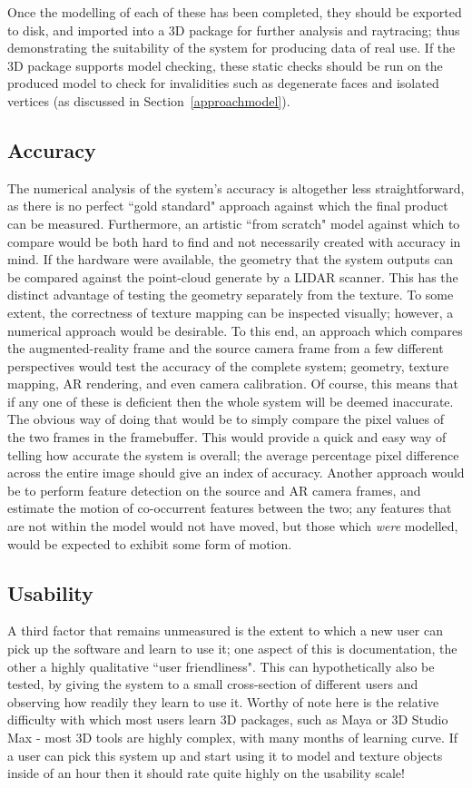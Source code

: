 \documentclass[a4paper,10pt]{article}
\begin{document}
Once the modelling of each of these has been completed, they should be exported to disk, and imported into a 3D package for further analysis and raytracing; thus demonstrating the suitability of the system for producing data of real use. If the 3D package supports model checking, these static checks should be run on the produced model to check for invalidities such as degenerate faces and isolated vertices (as discussed in Section~\ref{approachmodel}).

\subsection{Accuracy}
The numerical analysis of the system's accuracy is altogether less straightforward, as there is no perfect ``gold standard" approach against which the final product can be measured. Furthermore, an artistic ``from scratch" model against which to compare would be both hard to find and not necessarily created with accuracy in mind. If the hardware were available, the geometry that the system outputs can be compared against the point-cloud generate by a LIDAR scanner. This has the distinct advantage of testing the geometry separately from the texture. To some extent, the correctness of texture mapping can be inspected visually; however, a numerical approach would be desirable. To this end, an approach which compares the augmented-reality frame and the source camera frame from a few different perspectives would test the accuracy of the complete system; geometry, texture mapping, AR rendering, and even camera calibration. Of course, this means that if any one of these is deficient then the whole system will be deemed inaccurate. The obvious way of doing that would be to simply compare the pixel values of the two frames in the framebuffer. This would provide a quick and easy way of telling how accurate the system is overall; the average percentage pixel difference across the entire image should give an index of accuracy. Another approach would be to perform feature detection on the source and AR camera frames, and estimate the motion of co-occurrent features between the two; any features that are not within the model would not have moved, but those which \textit{were} modelled, would be expected to exhibit some form of motion. 

\subsection{Usability}
A third factor that remains unmeasured is the extent to which a new user can pick up the software and learn to use it; one aspect of this is documentation, the other a highly qualitative ``user friendliness". This can hypothetically also be tested, by giving the system to a small cross-section of different users and observing how readily they learn to use it. Worthy of note here is the relative difficulty with which most users learn 3D packages, such as Maya or 3D Studio Max - most 3D tools are highly complex, with many months of learning curve. If a user can pick this system up and start using it to model and texture objects inside of an hour then it should rate quite highly on the usability scale!
\end{document}
